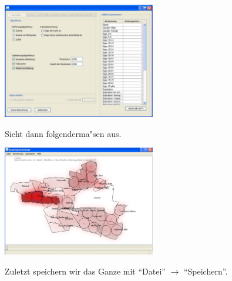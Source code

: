 \includegraphics[width=0.5\textwidth] {Allealgos2.pdf}

Sieht dann folgenderma"sen aus.

\includegraphics[width=0.5\textwidth] {AlleAlgos.pdf}

Zuletzt speichern wir das Ganze mit "`Datei"' $\rightarrow$ "`Speichern"'.
